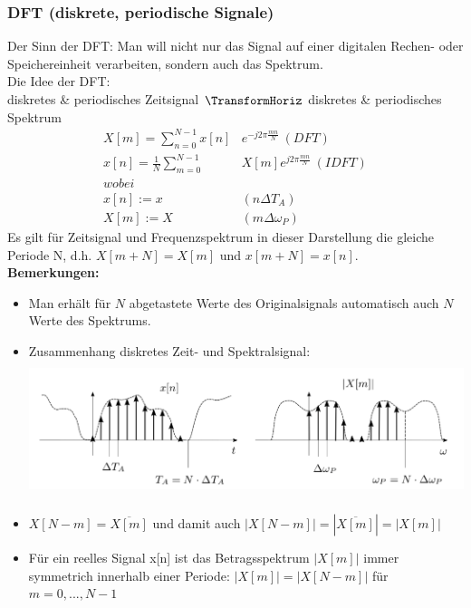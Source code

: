 \documentclass[12pt,a4paper]{scrartcl}
\begin{document}
  \subsubsection{DFT (diskrete, periodische Signale)}
  \label{sec.sub:sub:dft}

\noindent Der Sinn der DFT: Man will nicht nur das Signal auf einer digitalen Rechen- oder Speichereinheit verarbeiten, sondern auch das Spektrum. \\
  Die Idee der DFT: \\
    diskretes \& periodisches Zeitsignal $\TransformHoriz$ diskretes \& periodisches Spektrum \\
\begin{equation}
  \label{eq:18}
  \begin{split}
    X[m] = \sum_{n = 0}^{N-1} x[n]& e^{-j2\pi \frac{mn}{N}}\ (DFT) \\
    x[n] = \frac{1}{N}\sum_{m = 0}^{N-1} &X[m] e^{j2\pi \frac{mn}{N}}\ (IDFT) \\
    wobei& \\
    x[n] := x&(n\Delta T_A) \\
    X[m] := X&(m\Delta \omega_P)
  \end{split}
\end{equation}
\noindent Es gilt für Zeitsignal und Frequenzspektrum in dieser Darstellung die gleiche Periode N, d.h. $X[m+N] = X[m]$ und $x[m +N] = x[n]$. \\

\noindent  \textbf{Bemerkungen:}
  \begin{itemize}
    \item Man erhält für $N$ abgetastete Werte des Originalsignals automatisch auch $N$ Werte des Spektrums. 
    \item Zusammenhang diskretes Zeit- und Spektralsignal:\\\includegraphics[height = 4cm]{Pictures/ZusammenhangN.png} 
    \item $X[N-m] = \overline{X[m]}$ und damit auch $|X[N-m]| = |\overline{X[m]}| = |X[m]|$
    \item Für ein reelles Signal x[n] ist das Betragsspektrum $|X[m]|$ immer symmetrich innerhalb einer Periode: $|X[m]| = |X[N-m]|$ für $m = 0,...,N-1$ \\
  \end{itemize}
\end{document}
